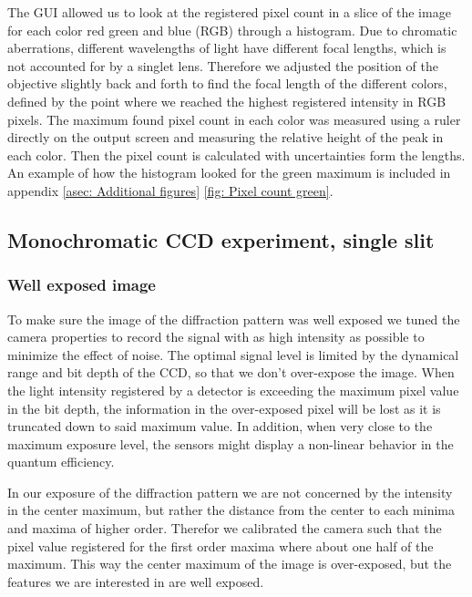\documentclass{emulateapj}
\begin{document}
The GUI allowed us to look at the registered pixel count in a slice of the image for each color red green and blue (RGB) through a histogram. Due to chromatic aberrations, different wavelengths of light have different focal lengths, which is not accounted for by a singlet lens. Therefore we adjusted the position of the objective slightly back and forth to find the focal length of the different colors, defined by the point where we reached the highest registered intensity in RGB pixels. The maximum found pixel count in each color was measured using a ruler directly on the output screen and measuring the relative height of the peak in each color. Then the pixel count is calculated with uncertainties form the lengths. An example of how the histogram looked for the green maximum is included in appendix \ref{asec: Additional figures} \cref{fig: Pixel count green}.

\subsection{Monochromatic CCD experiment, single slit}
\label{subsec: Method/Record mono CCD}

\subsubsection{Well exposed image}
\label{subsubsec: Method/Well exposed image}
To make sure the image of the diffraction pattern was well exposed we tuned the camera properties to record the signal with as high intensity as possible to minimize the effect of noise. The optimal signal level is limited by the dynamical range and bit depth of the CCD, so that we don't over-expose the image. When the light intensity registered by a detector is exceeding the maximum pixel value in the bit depth, the information in the over-exposed pixel will be lost as it is truncated down to said maximum value. In addition, when very close to the maximum exposure level, the sensors might display a non-linear behavior in the quantum efficiency.

In our exposure of the diffraction pattern we are not concerned by the intensity in the center maximum, but rather the distance from the center to each minima and maxima of higher order. Therefor we calibrated the camera such that the pixel value registered for the first order maxima where about one half of the maximum. This way the center maximum of the image is over-exposed, but the features we are interested in are well exposed.
\end{document}
